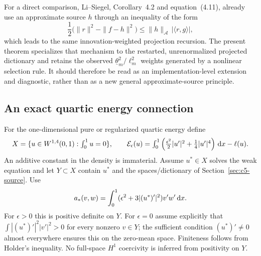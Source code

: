 \documentclass[11pt]{article}
\theoremstyle{remark}
\begin{document}
For a direct comparison, Li--Siegel, Corollary~4.2 and equation~(4.11),
already use an approximate source \(h\) through an inequality of the form
\[
 \frac12\big(\|r\|^2-\|f-h\|^2\big)
 \leq \|h\|_{\mathcal A}\,|\langle r,g\rangle|,
\]
which leads to the same innovation-weighted projection recursion. The
present theorem specializes that mechanism to the restarted, unrenormalized
projected dictionary and retains the observed
\(\underline\theta_m^2/\ell_m^2\) weights generated by a nonlinear
selection rule. It should therefore be read as an implementation-level
extension and diagnostic, rather than as a new general approximate-source
principle.

\subsection{An exact quartic energy connection}
\label{sec:c5-quartic}

For the one-dimensional pure or regularized quartic energy define
\[
 X=\{u\in W^{1,4}(0,1):\textstyle\int_0^1u=0\},\qquad
 \mathcal E_\epsilon(u)=\int_0^1
       \left(\tfrac{\epsilon^2}2|u'|^2+\tfrac14|u'|^4\right)\,\mathrm d x-\ell(u).
\]
An additive constant in the density is immaterial.
Assume $u^*\in X$ solves the weak equation and let $Y\subset X$
contain $u^*$ and the spaces/dictionary of
Section~\ref{sec:c5-source}. Use
\[
 a_*(v,w)=\int_0^1(\epsilon^2+3|(u^*)'|^2)v'w'\,\mathrm d x .
\]
For $\epsilon>0$ this is positive definite on $Y$.
For $\epsilon=0$ assume explicitly that
$\int |(u^*)'|^2|v'|^2>0$ for every nonzero $v\in Y$;
the sufficient condition $(u^*)'\ne0$ almost everywhere ensures this
on the zero-mean space. Finiteness follows from Holder's inequality.
No full-space $H^1$ coercivity is inferred from positivity on $Y$.
\end{document}
